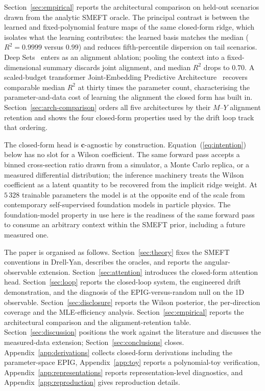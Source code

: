 \documentclass[11pt,a4paper]{article}
\begin{document}
Section~\ref{sec:empirical} reports the architectural comparison on held-out scenarios drawn from the analytic SMEFT oracle. The principal contrast is between the learned and fixed-polynomial feature maps of the same closed-form ridge, which isolates what the learning contributes: the learned basis matches the median ($R^2 = 0.9999$ versus $0.99$) and reduces fifth-percentile dispersion on tail scenarios. Deep Sets~\cite{Zaheer:2017deepsets,Heinrich:2024mpm} enters as an alignment ablation; pooling the context into a fixed-dimensional summary discards joint alignment, and median $R^2$ drops to $0.70$. A scaled-budget transformer Joint-Embedding Predictive Architecture~\cite{Assran:2023ijepa,Thimonier:2025tjepa} recovers comparable median $R^2$ at thirty times the parameter count, characterising the parameter-and-data cost of learning the alignment the closed form has built in. Section~\ref{sec:arch-comparison} orders all five architectures by their $M$--$Y$ alignment retention and shows the four closed-form properties used by the drift loop track that ordering.

The closed-form head is $\bm{c}$-agnostic by construction. Equation~(\ref{eq:intention}) below has no slot for a Wilson coefficient. The same forward pass accepts a binned cross-section ratio drawn from a simulator, a Monte Carlo replica, or a measured differential distribution; the inference machinery treats the Wilson coefficient as a latent quantity to be recovered from the implicit ridge weight. At $5\,328$ trainable parameters the model is at the opposite end of the scale from contemporary self-supervised foundation models in particle physics. The foundation-model property in use here is the readiness of the same forward pass to consume an arbitrary context within the SMEFT prior, including a future measured one.

The paper is organised as follows. Section~\ref{sec:theory} fixes the SMEFT conventions in Drell-Yan, describes the oracles, and reports the angular-observable extension. Section~\ref{sec:attention} introduces the closed-form attention head. Section~\ref{sec:loop} reports the closed-loop system, the engineered drift demonstration, and the diagnosis of the EPIG-versus-random null on the 1D observable. Section~\ref{sec:disclosure} reports the Wilson posterior, the per-direction coverage and the MLE-efficiency analysis. Section~\ref{sec:empirical} reports the architectural comparison and the alignment-retention table. Section~\ref{sec:discussion} positions the work against the literature and discusses the measured-data extension; Section~\ref{sec:conclusions} closes. Appendix~\ref{app:derivations} collects closed-form derivations including the parameter-space EPIG, Appendix~\ref{app:toy} reports a polynomial-toy verification, Appendix~\ref{app:representations} reports representation-level diagnostics, and Appendix~\ref{app:reproduction} gives reproduction details.
\end{document}
